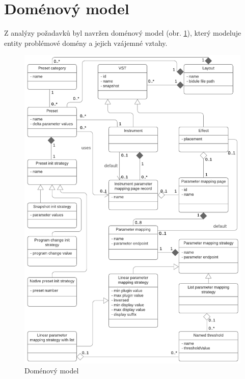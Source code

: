 \documentclass[thesis=M,czech]{FITthesis}[2019/03/06]
\begin{document}
	\section{Doménový model}
		Z analýzy požadavků byl navržen doménový model (obr. \ref{fig:DomainModel}),
		který modeluje entity problémové domény a jejich vzájemné vztahy.
		\begin{figure}
			\centering
			\includegraphics[width=1\textwidth]{DomainModel}
			\caption[Doménový model]{Doménový model}\label{fig:DomainModel}
		\end{figure}		
\end{document}
